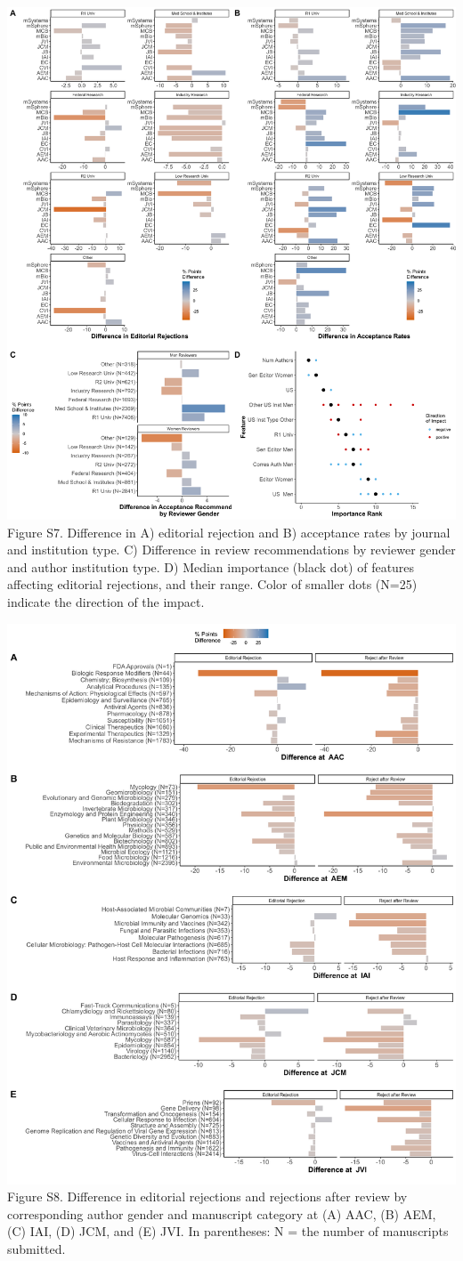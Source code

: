 \documentclass[11pt,]{article}
\begin{document}
\includegraphics{Figure_S7.png} Figure S7. Difference in A) editorial
rejection and B) acceptance rates by journal and institution type. C)
Difference in review recommendations by reviewer gender and author
institution type. D) Median importance (black dot) of features affecting
editorial rejections, and their range. Color of smaller dots (N=25)
indicate the direction of the impact.

\newpage

\includegraphics{Figure_S8.png} Figure S8. Difference in editorial
rejections and rejections after review by corresponding author gender
and manuscript category at (A) AAC, (B) AEM, (C) IAI, (D) JCM, and (E)
JVI. In parentheses: N = the number of manuscripts submitted.
\end{document}
